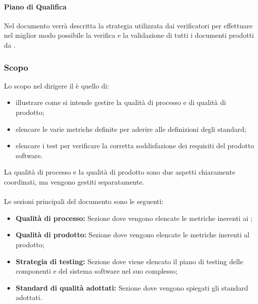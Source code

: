 \paragraph{Piano di Qualifica}\mbox{}
Nel documento \PdQ{} verrà descritta la strategia utilizzata dai verificatori per effettuare nel miglior modo possibile la verifica e la validazione di tutti i documenti prodotti da \Gruppo{}.

\subsubsection{Scopo}
Lo scopo nel dirigere il \PdQ{} è quello di:
\begin{itemize}
	\item illustrare come si intende gestire la qualità di processo e di qualità di prodotto;
	\item elencare le varie metriche definite per aderire alle definizioni degli standard;
	\item elencare i test per verificare la corretta soddisfazione dei requisiti del prodotto software.
\end{itemize}

La qualità di processo e la qualità di prodotto sono due aspetti chiaramente coordinati, ma vengono gestiti separatamente. \\ \\
Le sezioni principali del documento sono le seguenti:
\begin{itemize}
    \item \textbf{Qualità di processo:} Sezione dove vengono elencate le metriche inerenti ai ;
    \item \textbf{Qualità di prodotto:} Sezione dove vengono elencate le metriche inerenti al prodotto;
    \item \textbf{Strategia di testing:} Sezione dove viene elencato il piano di testing delle componenti e del sistema software nel suo complesso;
    \item \textbf{Standard di qualità adottati:} Sezione dove vengono spiegati gli standard adottati.
\end{itemize}
